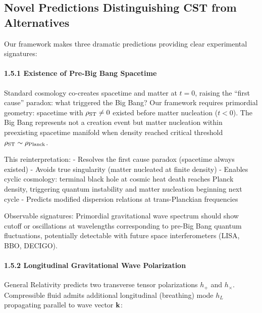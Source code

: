 \documentclass[11pt,a4paper]{article}
\begin{document}
\hypertarget{novel-predictions-distinguishing-cst-from-alternatives}{%
\subsection{Novel Predictions Distinguishing CST from
Alternatives}\label{novel-predictions-distinguishing-cst-from-alternatives}}

Our framework makes three dramatic predictions providing clear
experimental signatures:

\hypertarget{existence-of-pre-big-bang-spacetime}{%
\paragraph{1.5.1 Existence of Pre-Big Bang
Spacetime}\label{existence-of-pre-big-bang-spacetime}}

Standard cosmology co-creates spacetime and matter at \(t=0\), raising
the ``first cause'' paradox: what triggered the Big Bang? Our framework
requires primordial geometry: spacetime with \(\rho_{\rm ST} \neq 0\)
existed before matter nucleation (\(t<0\)). The Big Bang represents not
a creation event but matter nucleation within preexisting spacetime
manifold when density reached critical threshold
\(\rho_{\rm ST} \sim \rho_{\rm Planck}\).

This reinterpretation: - Resolves the first cause paradox (spacetime
always existed) - Avoids true singularity (matter nucleated at finite
density) - Enables cyclic cosmology: terminal black hole at cosmic heat
death reaches Planck density, triggering quantum instability and matter
nucleation beginning next cycle - Predicts modified dispersion relations
at trans-Planckian frequencies

Observable signatures: Primordial gravitational wave spectrum should
show cutoff or oscillations at wavelengths corresponding to pre-Big Bang
quantum fluctuations, potentially detectable with future space
interferometers (LISA, BBO, DECIGO).

\hypertarget{longitudinal-gravitational-wave-polarization}{%
\paragraph{1.5.2 Longitudinal Gravitational Wave
Polarization}\label{longitudinal-gravitational-wave-polarization}}

General Relativity predicts two transverse tensor polarizations \(h_+\)
and \(h_\times\). Compressible fluid admits additional longitudinal
(breathing) mode \(h_L\) propagating parallel to wave vector
\({\bf k}\):
\end{document}
